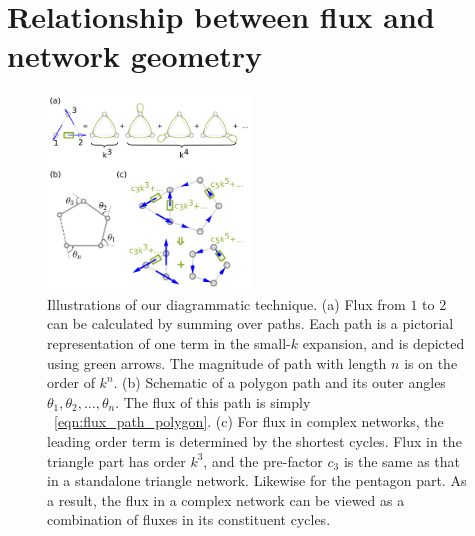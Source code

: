 \documentclass[
 preprint,
 preprintnumbers,
 amsmath,amssymb,
 aps,
 pre,
 longbibliography,
 superscriptaddress,
 10pt, twocolumn
]{revtex4-1}
\begin{document}
\section{Relationship between flux and network geometry} \label{sec:path}
\begin{figure}[ht]
	\centering
	\includegraphics[width=0.48\textwidth]{path_sum.pdf}
    \caption{Illustrations of our diagrammatic technique.
    (a) Flux from $1$ to $2$ can be calculated by summing over paths. Each path is a pictorial representation of one term in the small-$k$ expansion, and is depicted using green arrows. The magnitude of path with length $n$ is on the order of $k^n$.
    (b) Schematic of a polygon path and its outer angles $\theta_1,\theta_2,\dots,\theta_n$. The flux of this path is simply \eqnname~\eqref{eqn:flux_path_polygon}.
    (c) For flux in complex networks, the leading order term is determined by the shortest cycles. Flux in the triangle part has order $k^3$, and the pre-factor $c_3$ is the same as that in a standalone triangle network. Likewise for the pentagon part. As a result, the flux in a complex network can be viewed as a combination of fluxes in its constituent cycles.
    }
    \label{fig:path_sum}
\end{figure}
\end{document}
